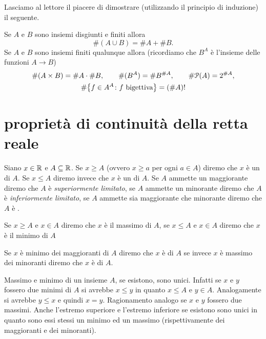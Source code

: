Lasciamo al lettore il piacere di dimostrare (utilizzando il principio di induzione)
il seguente.
\begin{theorem}
  Se $A$ e $B$ sono insiemi disgiunti e finiti allora  
  \[
    \#(A\cup B) = \#A + \#B.
  \]
  Se $A$ e $B$ sono insiemi finiti qualunque allora 
  (ricordiamo che $B^A$ è l'insieme delle funzioni $A\to B$)
  \begin{gather*}
    \#(A \times B) = \#A\cdot \#B, \qquad
    \#(B^A) = \#B^{\#A}, \qquad
    \#\mathcal P(A) = 2^{\# A}, \\
    \#{\left\{ f\in A^A\colon \text{$f$ bigettiva} \right\}} = (\#A)!
  \end{gather*}
\end{theorem}

\section{proprietà di continuità della retta reale}

\begin{definition}
  \mymark{***}
  Siano $x \in \mathbb R$ e $A \subseteq \mathbb R$.
  Se $x \ge A$ (ovvero $x \ge a$ per ogni $a\in A$)
  diremo che $x$ è un  di $A$.
  Se $x \le A$ diremo invece che $x$ è un  di $A$.
  Se $A$ ammette un maggiorante diremo che $A$ è \emph{superiormente limitato},
  se $A$ ammette un minorante diremo che $A$ è \emph{inferiormente limitato},
  se $A$ ammette sia maggiorante che minorante diremo che $A$ è .
  
  Se $x\ge A$ e $x\in A$ diremo che $x$ è il massimo di $A$,
  se $x\le A$ e $x\in A$ diremo che $x$ è il minimo di $A$
  
  Se $x$ è minimo dei maggioranti di $A$ diremo che $x$ è
  di $A$ se invece $x$ è massimo dei minoranti diremo che $x$ è
   di $A$.
\end{definition}

Massimo e minimo di un insieme $A$, se esistono, sono unici.
Infatti se $x$ e $y$ fossero due minimi di $A$ si avrebbe $x\le y$ in
quanto $x\le A$ e $y\in A$. Analogamente si avrebbe $y\le x$ e
quindi $x=y$. Ragionamento analogo se $x$ e $y$ fossero due massimi.
Anche l'estremo superiore e l'estremo inferiore se esistono sono
unici in quanto sono essi stessi un minimo ed un massimo
(rispettivamente dei maggioranti e dei minoranti).

